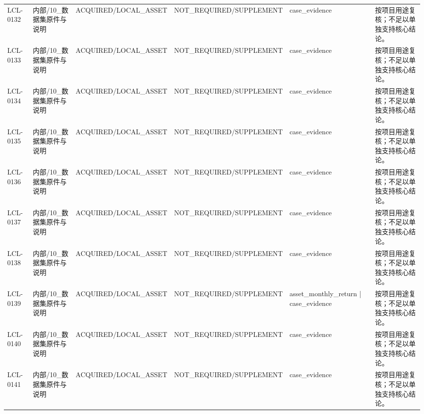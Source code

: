 \begin{landscape}
\begin{longtable}{p{1.8cm}p{2.6cm}p{2.6cm}p{2.6cm}p{4.8cm}p{7.2cm}}
LCL-0132 & 内部/\allowbreak{}10\_\allowbreak{}数据集原件与说明 & ACQUIRED/\allowbreak{}LOCAL\_\allowbreak{}ASSET & NOT\_\allowbreak{}REQUIRED/\allowbreak{}SUPPLEMENT & case\_\allowbreak{}evidence & 按项目用途复核；不足以单独支持核心结论。\\
LCL-0133 & 内部/\allowbreak{}10\_\allowbreak{}数据集原件与说明 & ACQUIRED/\allowbreak{}LOCAL\_\allowbreak{}ASSET & NOT\_\allowbreak{}REQUIRED/\allowbreak{}SUPPLEMENT & case\_\allowbreak{}evidence & 按项目用途复核；不足以单独支持核心结论。\\
LCL-0134 & 内部/\allowbreak{}10\_\allowbreak{}数据集原件与说明 & ACQUIRED/\allowbreak{}LOCAL\_\allowbreak{}ASSET & NOT\_\allowbreak{}REQUIRED/\allowbreak{}SUPPLEMENT & case\_\allowbreak{}evidence & 按项目用途复核；不足以单独支持核心结论。\\
LCL-0135 & 内部/\allowbreak{}10\_\allowbreak{}数据集原件与说明 & ACQUIRED/\allowbreak{}LOCAL\_\allowbreak{}ASSET & NOT\_\allowbreak{}REQUIRED/\allowbreak{}SUPPLEMENT & case\_\allowbreak{}evidence & 按项目用途复核；不足以单独支持核心结论。\\
LCL-0136 & 内部/\allowbreak{}10\_\allowbreak{}数据集原件与说明 & ACQUIRED/\allowbreak{}LOCAL\_\allowbreak{}ASSET & NOT\_\allowbreak{}REQUIRED/\allowbreak{}SUPPLEMENT & case\_\allowbreak{}evidence & 按项目用途复核；不足以单独支持核心结论。\\
LCL-0137 & 内部/\allowbreak{}10\_\allowbreak{}数据集原件与说明 & ACQUIRED/\allowbreak{}LOCAL\_\allowbreak{}ASSET & NOT\_\allowbreak{}REQUIRED/\allowbreak{}SUPPLEMENT & case\_\allowbreak{}evidence & 按项目用途复核；不足以单独支持核心结论。\\
LCL-0138 & 内部/\allowbreak{}10\_\allowbreak{}数据集原件与说明 & ACQUIRED/\allowbreak{}LOCAL\_\allowbreak{}ASSET & NOT\_\allowbreak{}REQUIRED/\allowbreak{}SUPPLEMENT & case\_\allowbreak{}evidence & 按项目用途复核；不足以单独支持核心结论。\\
LCL-0139 & 内部/\allowbreak{}10\_\allowbreak{}数据集原件与说明 & ACQUIRED/\allowbreak{}LOCAL\_\allowbreak{}ASSET & NOT\_\allowbreak{}REQUIRED/\allowbreak{}SUPPLEMENT & asset\_\allowbreak{}monthly\_\allowbreak{}return | case\_\allowbreak{}evidence & 按项目用途复核；不足以单独支持核心结论。\\
LCL-0140 & 内部/\allowbreak{}10\_\allowbreak{}数据集原件与说明 & ACQUIRED/\allowbreak{}LOCAL\_\allowbreak{}ASSET & NOT\_\allowbreak{}REQUIRED/\allowbreak{}SUPPLEMENT & case\_\allowbreak{}evidence & 按项目用途复核；不足以单独支持核心结论。\\
LCL-0141 & 内部/\allowbreak{}10\_\allowbreak{}数据集原件与说明 & ACQUIRED/\allowbreak{}LOCAL\_\allowbreak{}ASSET & NOT\_\allowbreak{}REQUIRED/\allowbreak{}SUPPLEMENT & case\_\allowbreak{}evidence & 按项目用途复核；不足以单独支持核心结论。\\

\end{longtable}
\end{landscape}
